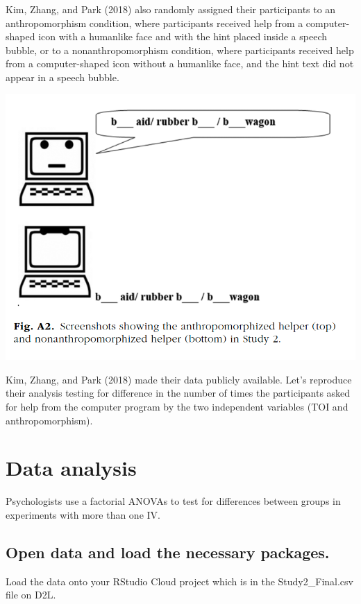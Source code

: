 \documentclass[
]{book}
\begin{document}
Kim, Zhang, and Park (2018) also randomly assigned their participants to an anthropomorphism condition, where participants received help from a computer-shaped icon with a humanlike face and with the hint placed inside a speech bubble, or to a nonanthropomorphism condition, where participants received help from a computer-shaped icon without a humanlike face, and the hint text did not appear in a speech bubble.

\includegraphics{img/anthropomor.png}

Kim, Zhang, and Park (2018) made their data publicly available. Let's reproduce their analysis testing for difference in the number of times the participants asked for help from the computer program by the two independent variables (TOI and anthropomorphism).

\hypertarget{data-analysis-3}{%
\section{Data analysis}\label{data-analysis-3}}

Psychologists use a factorial ANOVAs to test for differences between groups in experiments with more than one IV.

\hypertarget{open-data-and-load-the-necessary-packages.-1}{%
\subsection{Open data and load the necessary packages.}\label{open-data-and-load-the-necessary-packages.-1}}

Load the data onto your RStudio Cloud project which is in the Study2\_Final.csv file on D2L.
\end{document}
